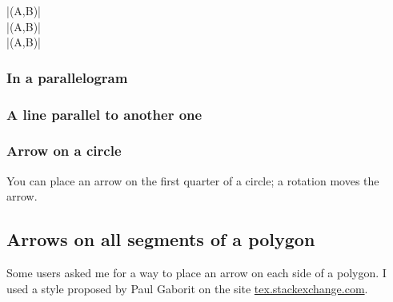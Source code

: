 |\tkzDrawSegment[tkz arrow=Stealth] (A,B)|\\
|\tkzDrawSegment[tkz arrow={To[scale=3] at .4}](A,B)|\\
|\tkzDrawSegment[tkz arrow={Latex[scale=5,blue] at .6}](A,B)|

\subsubsection{In a parallelogram}
\begin{tkzexample}[latex=7cm,small]
\end{tkzexample}

\subsubsection{A line parallel to another one}
\begin{tkzexample}[latex=7cm,small]
\end{tkzexample}

\subsubsection{Arrow on a circle}
You can place an arrow on the first quarter of a circle; a rotation moves the arrow.
\begin{tkzexample}[latex=7cm,small]
\end{tkzexample}

\subsection{Arrows on  all segments of a polygon}
Some users asked me for a way to place an arrow on each side of a polygon. I used a style proposed by Paul Gaborit on the site
\href{https://tex.stackexchange.com/questions/3161/tikz-how-to-draw-an-arrow-in-the-middle-of-the-line}{tex.stackexchange.com}.

